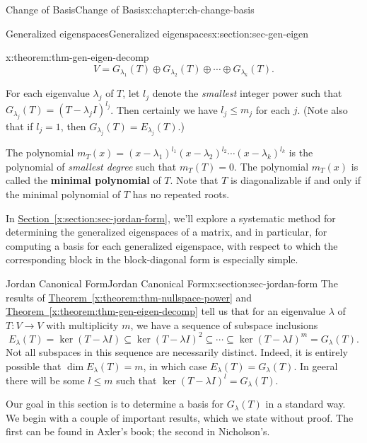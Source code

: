\documentclass[oneside,10pt,]{book}
\newcommand{\xreffont}{\relax}
\newcommand{\terminology}[1]{\textbf{#1}}
\numberwithin{equation}{section}
\begin{document}
\begin{chapterptx}{Change of Basis}{}{Change of Basis}{}{}{x:chapter:ch-change-basis}
\begin{sectionptx}{Generalized eigenspaces}{}{Generalized eigenspaces}{}{}{x:section:sec-gen-eigen}
\begin{theorem}{}{}{x:theorem:thm-gen-eigen-decomp}
\begin{equation*}
V = G_{\lambda_1}(T)\oplus G_{\lambda_2}(T)\oplus \cdots \oplus G_{\lambda_k}(T)\text{.}
\end{equation*}
%
\end{theorem}
For each eigenvalue \(\lambda_j\) of \(T\), let \(l_j\) denote the \emph{smallest} integer power such that \(G_{\lambda_j}(T) = (T-\lambda_j I)^{l_j}\). Then certainly we have \(l_j\leq m_j\) for each \(j\). (Note also that if \(l_j=1\), then \(G_{\lambda_j}(T)=E_{\lambda_j}(T)\).)%
\par
The polynomial \(m_T(x) = (x-\lambda_1)^{l_1}(x-\lambda_2)^{l_2}\cdots (x-\lambda_k)^{l_k}\) is the polynomial of \emph{smallest degree} such that \(m_T(T)=0\). The polynomial \(m_T(x)\) is called the \terminology{minimal polynomial} of \(T\). Note that \(T\) is diagonalizable if and only if the minimal polynomial of \(T\) has no repeated roots.%
\par
In \hyperref[x:section:sec-jordan-form]{Section~{\xreffont\ref{x:section:sec-jordan-form}}}, we'll explore a systematic method for determining the generalized eigenspaces of a matrix, and in particular, for computing a basis for each generalized eigenspace, with respect to which the corresponding block in the block-diagonal form is especially simple.%
\end{sectionptx}
%
%
\typeout{************************************************}
\typeout{************************************************}
%
\begin{sectionptx}{Jordan Canonical Form}{}{Jordan Canonical Form}{}{}{x:section:sec-jordan-form}
The results of \hyperref[x:theorem:thm-nullspace-power]{Theorem~{\xreffont\ref{x:theorem:thm-nullspace-power}}} and \hyperref[x:theorem:thm-gen-eigen-decomp]{Theorem~{\xreffont\ref{x:theorem:thm-gen-eigen-decomp}}} tell us that for an eigenvalue \(\lambda\) of \(T:V\to V\) with multiplicity \(m\), we have a sequence of subspace inclusions%
\begin{equation*}
E_\lambda(T) = \ker (T-\lambda I)\subseteq \ker (T-\lambda I)^2 \subseteq \cdots \subseteq \ker (T-\lambda I)^m = G_\lambda(T)\text{.}
\end{equation*}
Not all subspaces in this sequence are necessarily distinct. Indeed, it is entirely possible that \(\dim E_\lambda(T)=m\), in which case \(E_\lambda(T)=G_\lambda(T)\). In geeral there will be some \(l\leq m\) such that \(\ker (T-\lambda I)^l=G_\lambda(T)\).%
\par
Our goal in this section is to determine a basis for \(G_\lambda(T)\) in a standard way. We begin with a couple of important results, which we state without proof. The first can be found in Axler's book; the second in Nicholson's.%

\end{sectionptx}
\end{chapterptx}
\end{document}
